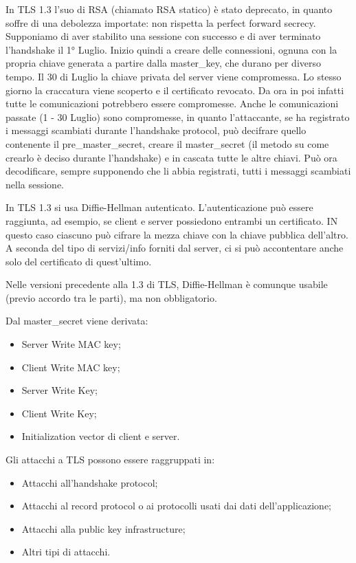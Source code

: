 In TLS 1.3 l'suo di RSA (chiamato RSA statico) è stato deprecato, in quanto soffre di una debolezza importate: non rispetta la perfect forward secrecy. Supponiamo di aver stabilito una sessione con successo e di aver terminato l'handshake il 1° Luglio. Inizio quindi a creare delle connessioni, ognuna con la propria chiave generata a partire dalla master\_key, che durano per diverso tempo.  Il 30 di Luglio la chiave privata del server viene compromessa. Lo stesso giorno la craccatura viene scoperto e il certificato revocato. Da ora in poi infatti tutte le comunicazioni potrebbero essere compromesse. Anche le comunicazioni passate (1 - 30 Luglio) sono compromesse, in quanto l'attaccante, se ha registrato i messaggi scambiati durante l'handshake protocol, può decifrare quello contenente il pre\_master\_secret, creare il master\_secret (il metodo su come crearlo è deciso durante l'handshake) e in cascata tutte le altre chiavi. Può ora decodificare, sempre supponendo che li abbia registrati, tutti i messaggi scambiati nella sessione.

In TLS 1.3 si usa Diffie-Hellman autenticato. L'autenticazione può essere raggiunta, ad esempio, se client e server possiedono entrambi un certificato. IN questo caso ciascuno può cifrare la mezza chiave con la chiave pubblica dell'altro. A seconda del tipo di servizi/info forniti dal server, ci si può accontentare anche solo del certificato di quest'ultimo.

Nelle versioni precedente alla 1.3 di TLS,  Diffie-Hellman è comunque usabile (previo accordo tra le parti), ma non obbligatorio.

Dal master\_secret viene derivata:
\begin{itemize}
    \item Server Write MAC key;
	\item Client Write MAC key;
	\item Server Write Key;
	\item Client Write Key;
	\item Initialization vector di client e server.
\end{itemize}

Gli attacchi a TLS possono essere raggruppati in:
\begin{itemize}
    \item Attacchi all'handshake protocol;
	\item Attacchi al record protocol o ai protocolli usati dai dati dell'applicazione;
	\item Attacchi alla public key infrastructure;
    \item Altri tipi di attacchi.
\end{itemize}

